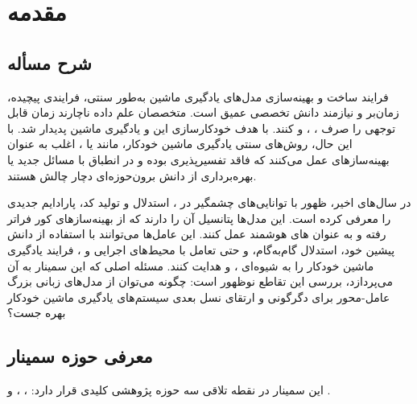 
\chapter{مقدمه}
\thispagestyle{empty}

\section{شرح مسأله}
فرایند ساخت و بهینه‌سازی مدل‌های یادگیری ماشین به‌طور سنتی، فرایندی پیچیده، زمان‌بر و نیازمند دانش تخصصی عمیق است. متخصصان علم داده ناچارند زمان قابل توجهی را صرف ، ، و  کنند.  با هدف خودکارسازی این  و  یادگیری ماشین پدیدار شد. با این حال، روش‌های سنتی یادگیری ماشین خودکار، مانند  یا ، اغلب به عنوان  بهینه‌سازهای  عمل می‌کنند که فاقد تفسیرپذیری بوده و در انطباق با مسائل جدید یا بهره‌برداری از دانش برون‌حوزه‌ای دچار چالش هستند.

در سال‌های اخیر، ظهور  با توانایی‌های چشمگیر در ، استدلال و تولید کد، پارادایم جدیدی را معرفی کرده است. این مدل‌ها پتانسیل آن را دارند که از بهینه‌سازهای کور فراتر رفته و به عنوان های هوشمند عمل کنند. این عامل‌ها می‌توانند با استفاده از دانش پیشین خود، استدلال گام‌به‌گام، و حتی تعامل با محیط‌های اجرایی و ، فرایند یادگیری ماشین خودکار را به شیوه‌ای ،  و  هدایت کنند. مسئله اصلی که این سمینار به آن می‌پردازد، بررسی این تقاطع نوظهور است: چگونه می‌توان از مدل‌های زبانی بزرگ عامل-محور برای دگرگونی و ارتقای نسل بعدی سیستم‌های یادگیری ماشین خودکار بهره جست؟

\section{معرفی حوزه سمینار}
این سمینار در نقطه تلاقی سه حوزه پژوهشی کلیدی قرار دارد: ، ، و .

